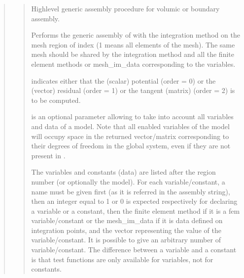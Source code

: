 \documentclass[a4paper,11pt,english]{sphinxmanual}
\begin{document}
\sphinxAtStartPar
{}
\begin{quote}

\sphinxAtStartPar
{}
\begin{quote}

\sphinxAtStartPar
High\sphinxhyphen{}level generic assembly procedure for volumic or boundary assembly.

\sphinxAtStartPar
Performs the generic assembly of  with the integration
method  on the mesh region of index  (\sphinxhyphen{}1 means all
elements of the mesh). The same mesh should be shared by
the integration method and all the finite element methods or
mesh\_im\_data corresponding to the variables.

\sphinxAtStartPar
{} indicates either that the (scalar) potential
(order = 0) or the (vector) residual (order = 1) or the
tangent (matrix) (order = 2) is to be computed.

\sphinxAtStartPar
{} is an optional parameter allowing to take into account
all variables and data of a model. Note that all enabled variables
of the model will occupy space in the returned vector/matrix
corresponding to their degrees of freedom in the global system, even
if they are not present in .

\sphinxAtStartPar
The variables and constants (data) are listed after the region number
(or optionally the model).
For each variable/constant, a name must be given first (as it is
referred in the assembly string), then an integer equal to 1 or 0
is expected respectively for declaring a variable or a constant,
then the finite element method if it is a fem variable/constant or
the mesh\_im\_data if it is data defined on integration points, and
the vector representing the value of the variable/constant.
It is possible to give an arbitrary number of variable/constant.
The difference between a variable and a constant is that test
functions are only available for variables, not for constants.


\end{quote}
\end{quote}
\end{document}
